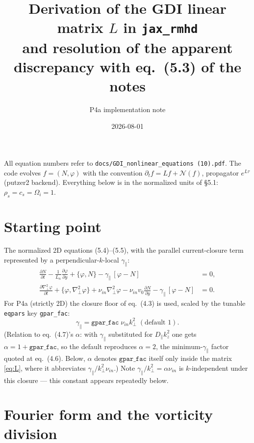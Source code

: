 \documentclass[11pt]{article}
\title{Derivation of the GDI linear matrix $L$ in \texttt{jax\_rmhd}\\
\large and resolution of the apparent discrepancy with eq.~(5.3) of the notes}
\author{P4a implementation note}
\date{2026-08-01}
\newcommand{\kp}{k_\perp}
\newcommand{\gpar}{\gamma_\parallel}
\newcommand{\nuin}{\nu_{in}}
\begin{document}
\maketitle

\noindent All equation numbers refer to \texttt{docs/GDI\_nonlinear\_equations (10).pdf}.
The code evolves $f=(N,\varphi)$ with the convention
$\partial_t f = L f + \mathcal{N}(f)$, propagator $e^{L\tau}$ (putzer2 backend).
Everything below is in the normalized units of \S5.1: $\rho_s=c_s=\Omega_i=1$.

\section{Starting point}

The normalized 2D equations (5.4)--(5.5), with the parallel current-closure term
represented by a perpendicular-$k$-local $\gpar$:
\begin{align}
\frac{\partial N}{\partial t} - \frac{1}{L_n}\frac{\partial\varphi}{\partial y}
  + \{\varphi, N\} - \gpar\,[\varphi - N] &= 0,
  \tag{5.4}\\
\frac{\partial \nabla_\perp^2\varphi}{\partial t} + \{\varphi,\nabla_\perp^2\varphi\}
  + \nuin\nabla_\perp^2\varphi - \nuin v_0 \frac{\partial N}{\partial y}
  - \gpar\,[\varphi-N] &= 0.
  \tag{5.5}
\end{align}
For P4a (strictly 2D) the closure floor of eq.~(4.3) is used, scaled by the tunable
\texttt{eqpars} key \texttt{gpar\_fac}:
\begin{equation}
\gpar = \texttt{gpar\_fac}\;\nuin \kp^2 \;(\text{default } 1).
\label{eq:closure}
\end{equation}
(Relation to eq.~(4.7)'s $\alpha$: with $\gpar$ substituted for $D_\parallel k_z^2$ one
gets $\alpha = 1 + \texttt{gpar\_fac}$, so the default reproduces $\alpha=2$, the
minimum-$\gpar$ factor quoted at eq.~(4.6). Below, $\alpha$ denotes
$\texttt{gpar\_fac}$ itself only inside the matrix \eqref{eq:L}, where it abbreviates
$\gpar/\kp^2\nuin$.)
Note $\gpar/\kp^2 = \alpha\nuin$ is $k$-independent under this closure --- this constant
appears repeatedly below.

\section{Fourier form and the vorticity division}
\end{document}
